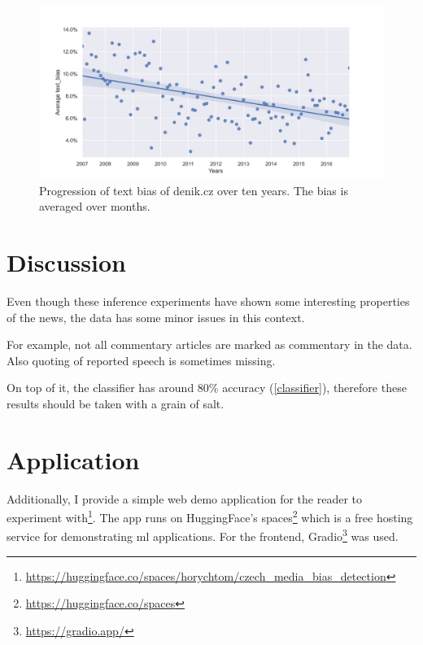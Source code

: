 \begin{figure}[h]

  \includegraphics[scale=0.5]{my_modules/multimedia/inference/denik_months2_clean.png}
  \caption{Progression of text bias of denik.cz over ten years. The bias is averaged over months.}
  \label{fig:months_clean}
\end{figure}





\section{Discussion}
Even though these inference experiments have shown some interesting properties of the news, the data has some minor issues in this context. 

For example, not all commentary articles are marked as commentary in the data. Also quoting of reported speech is sometimes missing. 

On top of it, the classifier has around 80\% accuracy (\ref{classifier}), therefore these results should be taken with a grain of salt.

\newpage


\section{Application}
Additionally, I provide a simple web demo application for the reader to experiment with\footnote{\url{https://huggingface.co/spaces/horychtom/czech_media_bias_detection}}. The app runs on HuggingFace's spaces\footnote{\url{https://huggingface.co/spaces}} which is a free hosting service for demonstrating \gls{ml} applications. For the frontend, Gradio\footnote{\url{https://gradio.app/}} was used.

